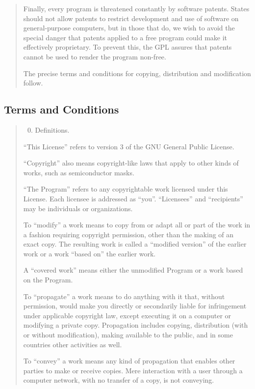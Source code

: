 \documentclass[letterpaper,10pt,english]{sphinxmanual}
\begin{document}
\begin{quote}
Finally, every program is threatened constantly by software patents.
States should not allow patents to restrict development and use of
software on general-purpose computers, but in those that do, we wish to
avoid the special danger that patents applied to a free program could
make it effectively proprietary.  To prevent this, the GPL assures that
patents cannot be used to render the program non-free.

The precise terms and conditions for copying, distribution and
modification follow.
\end{quote}


\subsection{Terms and Conditions}
\label{docs/license:terms-and-conditions}\begin{quote}
\begin{enumerate}
\setcounter{enumi}{-1}
\item {} 
Definitions.

\end{enumerate}

``This License'' refers to version 3 of the GNU General Public License.

``Copyright'' also means copyright-like laws that apply to other kinds of
works, such as semiconductor masks.

``The Program'' refers to any copyrightable work licensed under this
License.  Each licensee is addressed as ``you''.  ``Licensees'' and
``recipients'' may be individuals or organizations.

To ``modify'' a work means to copy from or adapt all or part of the work
in a fashion requiring copyright permission, other than the making of an
exact copy.  The resulting work is called a ``modified version'' of the
earlier work or a work ``based on'' the earlier work.

A ``covered work'' means either the unmodified Program or a work based
on the Program.

To ``propagate'' a work means to do anything with it that, without
permission, would make you directly or secondarily liable for
infringement under applicable copyright law, except executing it on a
computer or modifying a private copy.  Propagation includes copying,
distribution (with or without modification), making available to the
public, and in some countries other activities as well.

To ``convey'' a work means any kind of propagation that enables other
parties to make or receive copies.  Mere interaction with a user through
a computer network, with no transfer of a copy, is not conveying.


\end{quote}
\end{document}
